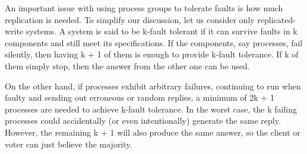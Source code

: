 \documentclass[sigchi]{acmart}
\begin{document}
An important issue with using process groups to tolerate faults is how
much replication is needed. To simplify our discussion, let us consider
only replicated-write systems. A system is said to be k-fault tolerant if it
can survive faults in k components and still meet its specifications. If the
components, say processes, fail silently, then having k + 1 of them is enough
to provide k-fault tolerance. If k of them simply stop, then the answer from
the other one can be used.

On the other hand, if processes exhibit arbitrary failures, continuing to
run when faulty and sending out erroneous or random replies, a minimum
of 2k + 1 processes are needed to achieve k-fault tolerance. In the worst case,
the k failing processes could accidentally (or even intentionally) generate the
same reply. However, the remaining k + 1 will also produce the same answer,
so the client or voter can just believe the majority.





\appendix
\end{document}
